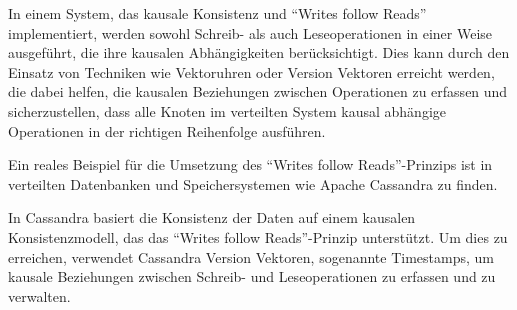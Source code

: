 \documentclass[../vs-script-first-v01.tex]{subfiles}
\begin{document}
In einem System, das kausale Konsistenz und \enquote{Writes follow Reads} implementiert, werden sowohl Schreib- als auch Leseoperationen in einer Weise ausgeführt, die ihre kausalen Abhängigkeiten berücksichtigt. Dies kann durch den Einsatz von Techniken wie Vektoruhren oder Version Vektoren erreicht werden, die dabei helfen, die kausalen Beziehungen zwischen Operationen zu erfassen und sicherzustellen, dass alle Knoten im verteilten System kausal abhängige Operationen in der richtigen Reihenfolge ausführen.

Ein reales Beispiel für die Umsetzung des \enquote{Writes follow Reads}-Prinzips ist in verteilten Datenbanken und Speichersystemen wie Apache Cassandra zu finden. 

In Cassandra basiert die Konsistenz der Daten auf einem kausalen Konsistenzmodell, das das \enquote{Writes follow Reads}-Prinzip unterstützt. Um dies zu erreichen, verwendet Cassandra Version Vektoren, sogenannte Timestamps, um kausale Beziehungen zwischen Schreib- und Leseoperationen zu erfassen und zu verwalten.
\end{document}
